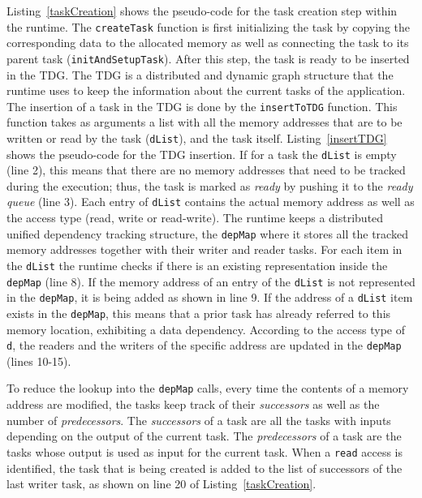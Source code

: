 Listing~\ref{taskCreation} shows the pseudo-code for the task creation step within the runtime.
The \texttt{createTask} function is first initializing the task by copying the corresponding data to the allocated memory as well as connecting the task to its parent task (\texttt{initAndSetupTask}).
After this step, the task is ready to be inserted in the TDG. 
The TDG is a distributed and dynamic graph structure that the runtime uses to keep the information about the current tasks of the application. 
The insertion of a task in the TDG is done by the \texttt{insertToTDG} function.
This function takes as arguments a list with all the memory addresses that are to be written or read by the task (\texttt{dList}), and the task itself.
Listing~\ref{insertTDG} shows the pseudo-code for the TDG insertion. 
If for a task the \texttt{dList} is empty (line 2), this means that there are no memory addresses that need to be tracked during the execution; thus, the task is marked as \textit{ready} by pushing it to the \textit{ready queue} (line 3).
Each entry of \texttt{dList} contains the actual memory address as well as the access type (read, write or read-write).
The runtime keeps a distributed unified dependency tracking structure, the \texttt{depMap} where it stores all the tracked memory addresses together with their writer and reader tasks.
For each item in the \texttt{dList} the runtime checks if there is an existing representation inside the \texttt{depMap} (line 8).
If the memory address of an entry of the \texttt{dList} is not represented in the \texttt{depMap}, it is being added as shown in line 9.
If the address of a \texttt{dList} item exists in the \texttt{depMap}, this means that a prior task has already referred to this memory location, exhibiting a data dependency.
According to the access type of \texttt{d}, the readers and the writers of the specific address are updated in the \texttt{depMap} (lines 10-15).

To reduce the lookup into the \texttt{depMap} calls, every time the contents of a memory address are modified, the tasks keep track of their \textit{successors} as well as the number of \textit{predecessors}.
The \textit{successors} of a task are all the tasks with inputs depending on the output of the current task.
The \textit{predecessors} of a task are the tasks whose output is used as input for the current task.
When a \texttt{read} access is identified, the task that is being created is added to the list of successors of the last writer task, as shown on line 20 of Listing~\ref{taskCreation}.

